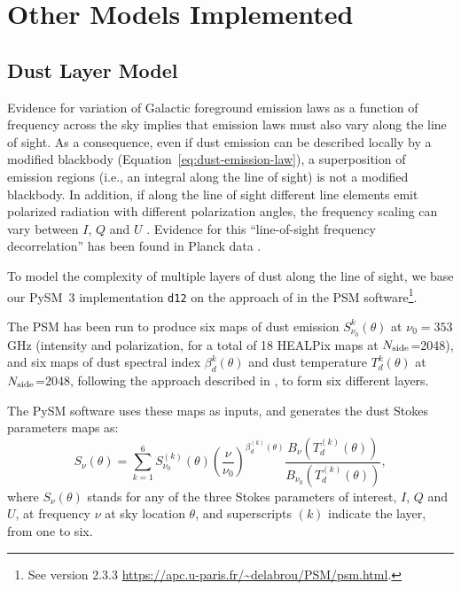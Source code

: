 \documentclass[twocolumn]{aastex631}
\begin{document}
\section{Other Models Implemented} \label{sec:other_models}

\subsection{Dust Layer Model} \label{sec:layers}
Evidence for variation of Galactic foreground emission laws as a function of frequency across the sky \citep[e.g.,][]{Krachmalnicoff:2018, SPIDERCollaboration:2024} implies that emission laws must also vary along the line of sight. As a consequence, even if dust emission can be described locally by a modified blackbody (Equation~\ref{eq:dust-emission-law}), a superposition of emission regions (i.e., an integral along the line of sight) is not a modified blackbody. In addition, if along the line of sight different line elements emit polarized radiation with different polarization angles, the frequency scaling can vary between $I$, $Q$ and $U$ \citep{Tassis:2015}. Evidence for this ``line-of-sight frequency decorrelation'' has been found in Planck data \citep{Pelgrims:2021}.

To model the complexity of multiple layers of dust along the line of sight, we base our PySM~3 implementation \texttt{d12} on the approach of \cite{Martinez-Solaeche:2018} in the PSM software\footnote{See version 2.3.3 \url{https://apc.u-paris.fr/~delabrou/PSM/psm.html}.}. 

The PSM has been run to produce six maps of dust emission $S_{\nu_0}^k(\theta)$ at $\nu_0 = 353$ GHz (intensity and polarization, for a total of 18 HEALPix maps at $N_{\rm side}$=2048), and six maps of dust spectral index $\beta_d^k(\theta)$ and dust temperature $T_d^k(\theta)$ at $N_{\rm side}$=2048, following the approach described in \cite{Martinez-Solaeche:2018}, to form six different layers.

The PySM software uses these maps as inputs, and generates the dust Stokes parameters maps as:
\begin{equation}
    S_\nu(\theta) = \sum_{k=1}^6 S^{(k)}_{\nu_0}(\theta)
    \left( \frac{\nu}{\nu_0} \right)^{\beta^{(k)}_d(\theta)}
    \frac{B_\nu(T^{(k)}_d(\theta))}{B_{\nu_0}(T^{(k)}_d(\theta))},
\end{equation}
where $S_\nu(\theta)$ stands for any of the three Stokes parameters of interest, $I$, $Q$ and $U$, at frequency $\nu$ at sky location $\theta$, and superscripts ${(k)}$ indicate the layer, from one to six.
\end{document}
